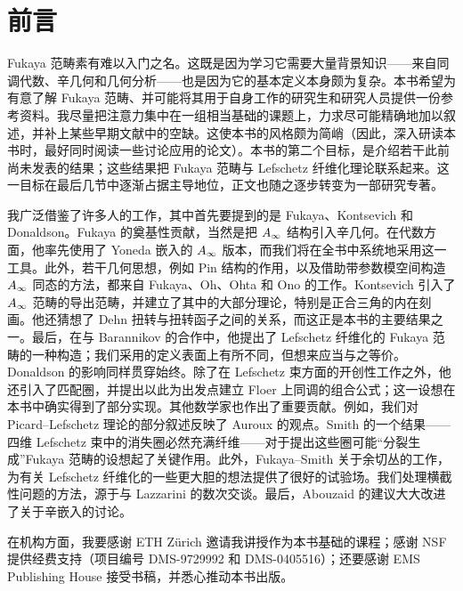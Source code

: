 \chapter*{前言}
Fukaya 范畴素有难以入门之名。这既是因为学习它需要大量背景知识——来自同调代数、辛几何和几何分析——也是因为它的基本定义本身颇为复杂。本书希望为有意了解 Fukaya 范畴、并可能将其用于自身工作的研究生和研究人员提供一份参考资料。我尽量把注意力集中在一组相当基础的课题上，力求尽可能精确地加以叙述，并补上某些早期文献中的空缺。这使本书的风格颇为简峭（因此，深入研读本书时，最好同时阅读一些讨论应用的论文）。本书的第二个目标，是介绍若干此前尚未发表的结果；这些结果把 Fukaya 范畴与 Lefschetz 纤维化理论联系起来。这一目标在最后几节中逐渐占据主导地位，正文也随之逐步转变为一部研究专著。

我广泛借鉴了许多人的工作，其中首先要提到的是 Fukaya、Kontsevich 和 Donaldson。Fukaya 的奠基性贡献，当然是把 $A_\infty$ 结构引入辛几何。在代数方面，他率先使用了 Yoneda 嵌入的 $A_\infty$ 版本，而我们将在全书中系统地采用这一工具。此外，若干几何思想，例如 Pin 结构的作用，以及借助带参数模空间构造 $A_\infty$ 同态的方法，都来自 Fukaya、Oh、Ohta 和 Ono 的工作。Kontsevich 引入了 $A_\infty$ 范畴的导出范畴，并建立了其中的大部分理论，特别是正合三角的内在刻画。他还猜想了 Dehn 扭转与扭转函子之间的关系，而这正是本书的主要结果之一。最后，在与 Barannikov 的合作中，他提出了 Lefschetz 纤维化的 Fukaya 范畴的一种构造；我们采用的定义表面上有所不同，但想来应当与之等价。Donaldson 的影响同样贯穿始终。除了在 Lefschetz 束方面的开创性工作之外，他还引入了匹配圈，并提出以此为出发点建立 Floer 上同调的组合公式；这一设想在本书中确实得到了部分实现。其他数学家也作出了重要贡献。例如，我们对 Picard–Lefschetz 理论的部分叙述反映了 Auroux 的观点。Smith 的一个结果——四维 Lefschetz 束中的消失圈必然充满纤维——对于提出这些圈可能“分裂生成”Fukaya 范畴的设想起了关键作用。此外，Fukaya–Smith 关于余切丛的工作，为有关 Lefschetz 纤维化的一些更大胆的想法提供了很好的试验场。我们处理横截性问题的方法，源于与 Lazzarini 的数次交谈。最后，Abouzaid 的建议大大改进了关于辛嵌入的讨论。

在机构方面，我要感谢 ETH Zürich 邀请我讲授作为本书基础的课程；感谢 NSF 提供经费支持（项目编号 DMS-9729992 和 DMS-0405516）；还要感谢 EMS Publishing House 接受书稿，并悉心推动本书出版。
